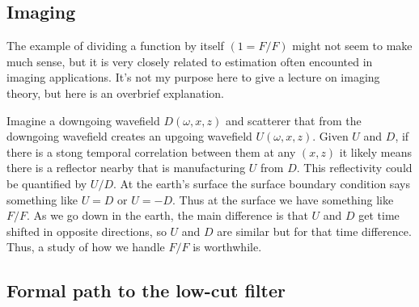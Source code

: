 
\subsection{Imaging}
The example of dividing a function by itself $(1=F/F)$ might not
seem to make much sense, but it is very closely related to estimation
often encounted in imaging applications.
It's not my purpose here to give a lecture on imaging theory, but
here is an overbrief explanation.
\par
Imagine a downgoing wavefield $D(\omega,x,z)$ and scatterer that
from the downgoing wavefield creates an upgoing wavefield $U(\omega,x,z)$.
Given $U$ and $D$, if there is a stong temporal correlation between them
at any $(x,z)$ it likely means there is a reflector nearby that is
manufacturing $U$ from $D$.
This reflectivity could be quantified by $U/D$.
At the earth's surface the surface boundary condition says something like
$U=D$ or $U=-D$.   Thus at the surface we have something like $F/F$.
As we go down in the earth, the main difference is that $U$ and $D$ get
time shifted in opposite directions, so $U$ and $D$ are similar but
for that time difference.  Thus, a study of how we handle $F/F$ is worthwhile.

\subsection{Formal path to the low-cut filter}


